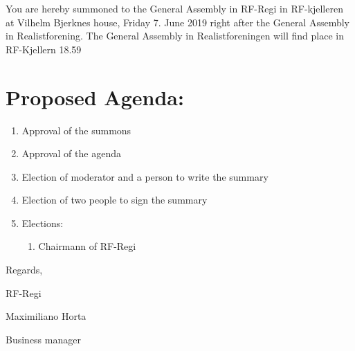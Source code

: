 \documentclass[a4paper]{article}
\begin{document}
You are hereby summoned to the General Assembly in RF-Regi in RF-kjelleren at
Vilhelm Bjerknes house, Friday 7. June 2019 right after
the General Assembly in Realistforening. The General Assembly in Realistforeningen
will find place in RF-Kjellern 18.59\\

\section*{\textsf{\large{Proposed Agenda:}}}
\begin{enumerate}
    \item Approval of the summons
    \item Approval of the agenda
    \item Election of moderator and a person to write the summary
    \item Election of two people to sign the summary
    \item Elections:
    \begin{enumerate}
        \item Chairmann of RF-Regi
    \end{enumerate}
\end{enumerate}

\vspace{2cm}
Regards,

RF-Regi

Maximiliano Horta

Business manager
\end{document}
